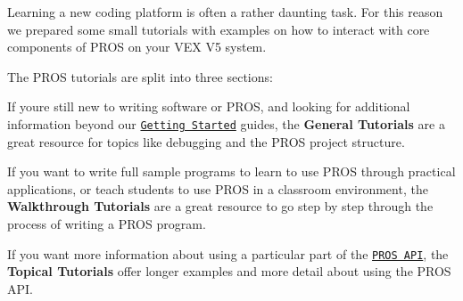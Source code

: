 Learning a new coding platform is often a rather daunting task. For this reason we prepared some small tutorials with examples on how to interact with core components of P\+R\+OS on your V\+EX V5 system.

The P\+R\+OS tutorials are split into three sections\+:

If you\textquotesingle{}re still new to writing software or P\+R\+OS, and looking for additional information beyond our \href{../getting-started/index.html}{\tt Getting Started} guides, the {\bfseries General Tutorials} are a great resource for topics like debugging and the P\+R\+OS project structure.

If you want to write full sample programs to learn to use P\+R\+OS through practical applications, or teach students to use P\+R\+OS in a classroom environment, the {\bfseries Walkthrough Tutorials} are a great resource to go step by step through the process of writing a P\+R\+OS program.

If you want more information about using a particular part of the \href{../api/index.html}{\tt P\+R\+OS A\+PI}, the {\bfseries Topical Tutorials} offer longer examples and more detail about using the P\+R\+OS A\+PI. 